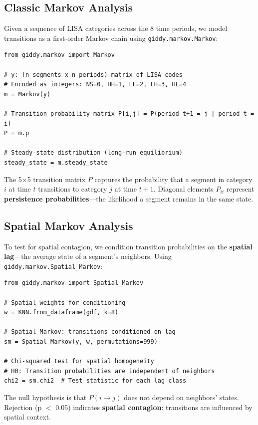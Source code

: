 \documentclass[11pt,a4paper]{article}
\begin{document}
\subsection{Classic Markov Analysis}

Given a sequence of LISA categories across the 8 time periods, we model transitions as a first-order Markov chain using \texttt{giddy.markov.Markov}:

\begin{lstlisting}
from giddy.markov import Markov

# y: (n_segments x n_periods) matrix of LISA codes
# Encoded as integers: NS=0, HH=1, LL=2, LH=3, HL=4
m = Markov(y)

# Transition probability matrix P[i,j] = P(period_t+1 = j | period_t = i)
P = m.p

# Steady-state distribution (long-run equilibrium)
steady_state = m.steady_state
\end{lstlisting}

The 5$\times$5 transition matrix $P$ captures the probability that a segment in category $i$ at time $t$ transitions to category $j$ at time $t+1$. Diagonal elements $P_{ii}$ represent \textbf{persistence probabilities}---the likelihood a segment remains in the same state.

\subsection{Spatial Markov Analysis}

To test for spatial contagion, we condition transition probabilities on the \textbf{spatial lag}---the average state of a segment's neighbors. Using \texttt{giddy.markov.Spatial\_Markov}:

\begin{lstlisting}
from giddy.markov import Spatial_Markov

# Spatial weights for conditioning
w = KNN.from_dataframe(gdf, k=8)

# Spatial Markov: transitions conditioned on lag
sm = Spatial_Markov(y, w, permutations=999)

# Chi-squared test for spatial homogeneity
# H0: Transition probabilities are independent of neighbors
chi2 = sm.chi2  # Test statistic for each lag class
\end{lstlisting}

The null hypothesis is that $P(i \to j)$ does not depend on neighbors' states. Rejection (p $<$ 0.05) indicates \textbf{spatial contagion}: transitions are influenced by spatial context.
\end{document}
